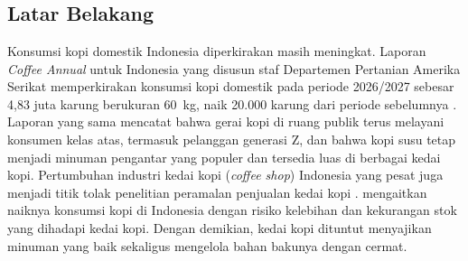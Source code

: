 \chapter{\babSatu}
\label{bab:pendahuluan}


\section{Latar Belakang}
\label{sec:latar-belakang}

Konsumsi kopi domestik Indonesia diperkirakan masih meningkat. Laporan \textit{Coffee Annual} untuk Indonesia yang disusun staf Departemen Pertanian Amerika Serikat memperkirakan konsumsi kopi domestik pada periode 2026/2027 sebesar 4,83 juta karung berukuran 60~kg, naik 20.000 karung dari periode sebelumnya \citep*{rahmanulloh2026coffee}. Laporan yang sama mencatat bahwa gerai kopi di ruang publik terus melayani konsumen kelas atas, termasuk pelanggan generasi Z, dan bahwa kopi susu tetap menjadi minuman pengantar yang populer dan tersedia luas di berbagai kedai kopi. Pertumbuhan industri kedai kopi (\textit{coffee shop}) Indonesia yang pesat juga menjadi titik tolak penelitian peramalan penjualan kedai kopi \citep*{azzahra2025forecasting}. \citet*{pattisealnno2026comparative} mengaitkan naiknya konsumsi kopi di Indonesia dengan risiko kelebihan dan kekurangan stok yang dihadapi kedai kopi. Dengan demikian, kedai kopi dituntut menyajikan minuman yang baik sekaligus mengelola bahan bakunya dengan cermat.

